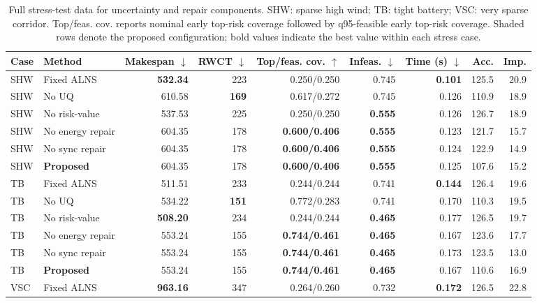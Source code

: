 \begin{table}[H]
\centering
\caption{Full stress-test data for uncertainty and repair components. SHW: sparse high wind; TB: tight battery; VSC: very sparse corridor. Top/feas. cov. reports nominal early top-risk coverage followed by q95-feasible early top-risk coverage. Shaded rows denote the proposed configuration; bold values indicate the best value within each stress case.}
\label{tab:stress-results}
\small
\setlength{\tabcolsep}{2.7pt}
\begin{tabular}{@{}llrrrrrrr@{}}
\toprule
Case & Method & Makespan $\downarrow$ & RWCT $\downarrow$ & Top/feas. cov. $\uparrow$ & Infeas. $\downarrow$ & Time (s) $\downarrow$ & Acc. & Imp. \\
\midrule
SHW & Fixed ALNS & \textbf{532.34} & 223 & 0.250/0.250 & 0.745 & \textbf{0.101} & 125.5 & 20.9 \\
SHW & No UQ & 610.58 & \textbf{169} & 0.617/0.272 & 0.745 & 0.126 & 110.9 & 18.9 \\
SHW & No risk-value & 537.53 & 225 & 0.250/0.250 & \textbf{0.555} & 0.126 & 126.7 & 18.9 \\
SHW & No energy repair & 604.35 & 178 & \textbf{0.600/0.406} & \textbf{0.555} & 0.123 & 121.7 & 15.7 \\
SHW & No sync repair & 604.35 & 178 & \textbf{0.600/0.406} & \textbf{0.555} & 0.124 & 122.9 & 14.9 \\
\rowcolor{gray!10}
SHW & \textbf{Proposed} & 604.35 & 178 & \textbf{0.600/0.406} & \textbf{0.555} & 0.125 & 107.6 & 15.2 \\
\addlinespace[2pt]
TB & Fixed ALNS & 511.51 & 233 & 0.244/0.244 & 0.741 & \textbf{0.144} & 126.4 & 19.6 \\
TB & No UQ & 534.22 & \textbf{151} & 0.772/0.283 & 0.741 & 0.170 & 110.3 & 19.5 \\
TB & No risk-value & \textbf{508.20} & 234 & 0.244/0.244 & \textbf{0.465} & 0.177 & 126.5 & 19.7 \\
TB & No energy repair & 553.24 & 155 & \textbf{0.744/0.461} & \textbf{0.465} & 0.167 & 123.6 & 17.7 \\
TB & No sync repair & 553.24 & 155 & \textbf{0.744/0.461} & \textbf{0.465} & 0.173 & 123.5 & 13.0 \\
\rowcolor{gray!10}
TB & \textbf{Proposed} & 553.24 & 155 & \textbf{0.744/0.461} & \textbf{0.465} & 0.167 & 110.6 & 16.9 \\
\addlinespace[2pt]
VSC & Fixed ALNS & \textbf{963.16} & 347 & 0.264/0.260 & 0.732 & \textbf{0.172} & 126.5 & 22.8 \\

\end{tabular}
\end{table}
